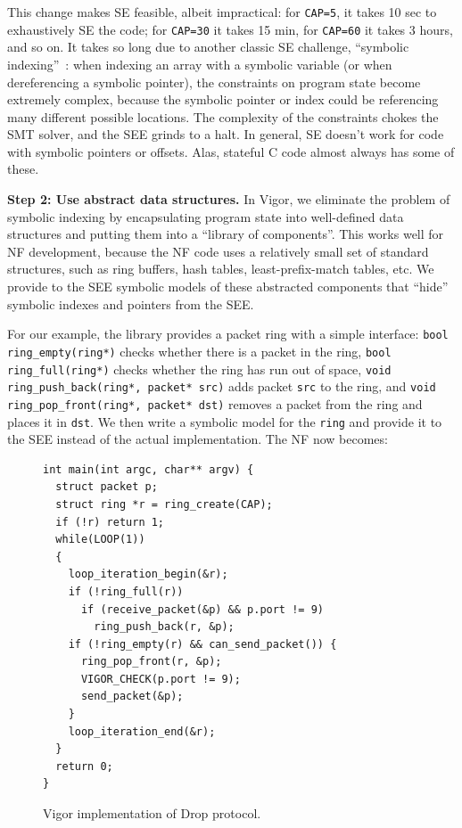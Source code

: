 \documentclass[letterpaper,twocolumn,10pt]{article}
\newcommand{\code}[1]{\lstinline{#1}}
\begin{document}
This change makes SE feasible, albeit impractical: for \code{CAP=5}, it takes 10
sec to exhaustively SE the code; for \code{CAP=30} it takes 15 min, for
\code{CAP=60} it takes 3 hours, and so on. It takes so long due to another classic
SE challenge, ``symbolic
indexing''~\cite{sen2005cute,godefroid2008automated,boonstoppel2008rwset}: when
indexing an array with a symbolic variable (or when dereferencing a symbolic
pointer), the constraints on program state become extremely complex, because the
symbolic pointer or index could be referencing many different possible
locations. The complexity of the constraints chokes the SMT solver, and the SEE
grinds to a halt. In general, SE doesn't work for code with symbolic pointers or
offsets. Alas, stateful C code almost always has some of these.

{\bf Step 2: Use abstract data structures.} In Vigor, we eliminate the problem
of symbolic indexing by encapsulating program state into well-defined data
structures and putting them into a ``library of components''. This works well
for NF development, because the NF code uses a relatively small set of standard
structures, such as ring buffers, hash tables, least-prefix-match tables, etc.
We provide to the SEE symbolic models of these abstracted components that
``hide'' symbolic indexes and pointers from the SEE.

For our example, the library provides a packet ring with a simple interface:
\code{bool ring_empty(ring*)} checks whether there is a packet in the ring,
\code{bool ring_full(ring*)} checks whether the ring has run out of space, \code{void
  ring_push_back(ring*, packet* src)} adds packet \code{src} to the ring, and
\code{void ring_pop_front(ring*, packet* dst)} removes a packet from the ring
and places it in \code{dst}. We then write a symbolic model for the \code{ring}
and provide it to the SEE instead of the actual implementation. The NF now
becomes:

\begin{figure}[h!]
\begin{lstlisting}
int main(int argc, char** argv) {
  struct packet p;
  struct ring *r = ring_create(CAP);
  if (!r) return 1;
  while(LOOP(1))
  {
    loop_iteration_begin(&r);
    if (!ring_full(r))
      if (receive_packet(&p) && p.port != 9)
        ring_push_back(r, &p);
    if (!ring_empty(r) && can_send_packet()) {
      ring_pop_front(r, &p);
      VIGOR_CHECK(p.port != 9);
      send_packet(&p);
    }
    loop_iteration_end(&r);
  }
  return 0;
}
\end{lstlisting}
  \caption{Vigor implementation of Drop protocol.}
  \label{lst:vigor}
\end{figure}
\end{document}
